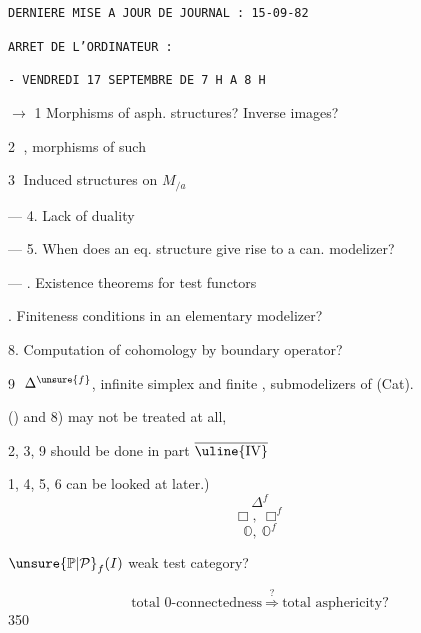 \texttt{DERNIERE MISE A JOUR DE JOURNAL : 15-09-82}

\texttt{ARRET DE L'ORDINATEUR :}

\texttt{- VENDREDI 17 SEPTEMBRE DE 7 H A 8 H}

$\longrightarrow$ 1 Morphisms of asph. structures? Inverse images?

\textcircled{2} , morphisms of such

\textcircled{3} Induced structures on $M_{/a}$

--- 4. Lack of duality

--- 5. When does an eq. structure  give rise to a can. modelizer?

--- . Existence theorems for test functors

. Finiteness conditions in an elementary modelizer?

8. Computation of cohomology by boundary operator?

\textcircled{9} $\Delta^{\unsure{f}}$, infinite simplex and finite , submodelizers of (Cat).


() and 8) may not be treated at all,

2, 3, 9 should be done in part $\overline{\text{\uline{IV}}}$

1, 4, 5, 6 can be looked at later.)
\[
\Delta^f
\]
\[
\Box,\ \Box^f
\]
\[
\mathbb O,\ \mathbb O^f
\]

$\unsure{\mathbb P|\mathcal P}_f(I)$ weak test category?



\[
\text{total 0-connectedness}\ \overset{?}{\Longrightarrow}\
\text{total asphericity?}
\]
\scanpage{4}
350

